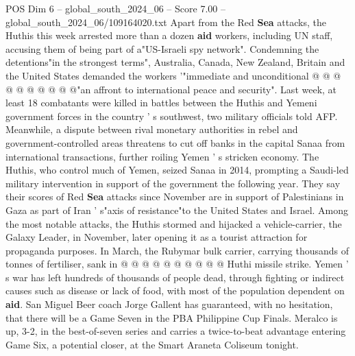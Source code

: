 \begin{textsample}{POS Dim 6 – global\_south\_2024\_06 – Score 7.00 – global\_south\_2024\_06/109164020.txt}
Apart from the Red \textbf{Sea} attacks, the Huthis this week arrested more than a dozen \textbf{aid} workers, including UN staff, accusing them of being part of a"US-Israeli spy network".
Condemning the detentions"in the strongest terms", Australia, Canada, New Zealand, Britain and the United States demanded the workers '"immediate and unconditional @ @ @ @ @ @ @ @ @ @"an affront to international peace and security".
Last week, at least 18 combatants were killed in battles between the Huthis and Yemeni government forces in the country ' s southwest, two military officials told AFP.
Meanwhile, a dispute between rival monetary authorities in rebel and government-controlled areas threatens to cut off banks in the capital Sanaa from international transactions, further roiling Yemen ' s stricken economy.
The Huthis, who control much of Yemen, seized Sanaa in 2014, prompting a Saudi-led military intervention in support of the government the following year.
They say their scores of Red \textbf{Sea} attacks since November are in support of Palestinians in Gaza as part of Iran ' s"axis of resistance"to the United States and Israel.
Among the most notable attacks, the Huthis stormed and hijacked a vehicle-carrier, the Galaxy Leader, in November, later opening it as a tourist attraction for propaganda purposes.
In March, the Rubymar bulk carrier, carrying thousands of tonnes of fertiliser, sank in @ @ @ @ @ @ @ @ @ @ Huthi missile strike.
Yemen ' s war has left hundreds of thousands of people dead, through fighting or indirect causes such as disease or lack of food, with most of the population dependent on \textbf{aid}.
San Miguel Beer coach Jorge Gallent has guaranteed, with no hesitation, that there will be a Game Seven in the PBA Philippine Cup Finals.
Meralco is up, 3-2, in the best-of-seven series and carries a twice-to-beat advantage entering Game Six, a potential closer, at the Smart Araneta Coliseum tonight.

\end{textsample}
